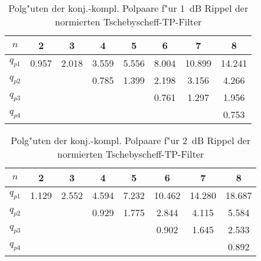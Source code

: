 \begin{table}[!htb]
\begin{center}
{\footnotesize
\begin{tabular}{|c||c|c|c|c|c|c|c|}\hline
$n$ & 2 & 3 & 4 & 5 & 6 & 7 & 8 \\ \hline\hline
$q_{p1}$ & 0.957 & 2.018 & 3.559 & 5.556 & 8.004 & 10.899 & 14.241 \\ \hline
$q_{p2}$ &       &       & 0.785 & 1.399 & 2.198 & 3.156 & 4.266 \\ \hline
$q_{p3}$ &       &       &       &       & 0.761 & 1.297 & 1.956 \\ \hline
$q_{p4}$ &       &       &       &       &       &       & 0.753 \\ \hline
\end{tabular}
}
\end{center}\vspace*{-4mm}\caption{Polg"uten der konj.-kompl. Polpaare f"ur 1~dB Rippel der normierten Tschebyscheff-TP-Filter} \label{pg-1}
\end{table}


\clearpage


\begin{table}[!htb]
\begin{center}
{\footnotesize
\begin{tabular}{|c||c|c|c|c|c|c|c|}\hline
$n$ & 2 & 3 & 4 & 5 & 6 & 7 & 8 \\ \hline\hline
$q_{p1}$ & 1.129 & 2.552 & 4.594 & 7.232 & 10.462 & 14.280 & 18.687 \\ \hline
$q_{p2}$ &       &       & 0.929 & 1.775 & 2.844 & 4.115 & 5.584 \\ \hline
$q_{p3}$ &       &       &       &       & 0.902 & 1.645 & 2.533 \\ \hline
$q_{p4}$ &       &       &       &       &       &       & 0.892 \\ \hline
\end{tabular}
}
\end{center}\vspace*{-4mm}\caption{Polg"uten der konj.-kompl. Polpaare f"ur 2~dB Rippel der normierten Tschebyscheff-TP-Filter} \label{gp-2}
\end{table}

